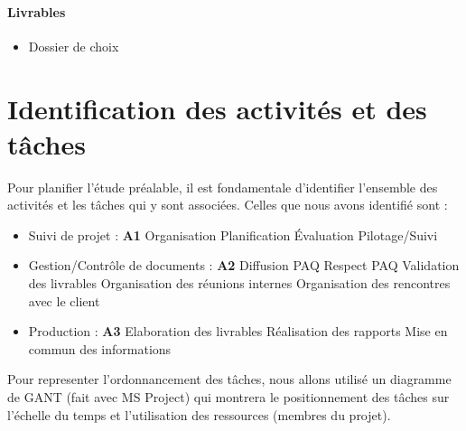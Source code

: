 \paragraph{Livrables}
\begin{itemize}
    \item Dossier de choix
\end{itemize}

\section{Identification des activités et des tâches}

Pour planifier l’étude préalable, il est fondamentale d’identifier l’ensemble des activités et les tâches qui y sont associées. Celles que nous avons identifié sont :
\begin{itemize}
    \item Suivi de projet : {\bf A1}
        \subitem Organisation
        \subitem Planification
        \subitem Évaluation
        \subitem Pilotage/Suivi

    \item Gestion/Contrôle de documents : {\bf A2}
        \subitem Diffusion PAQ
        \subitem Respect PAQ
        \subitem Validation des livrables
        \subitem Organisation des réunions internes
        \subitem Organisation des rencontres avec le client

    \item Production : {\bf A3}
        \subitem Elaboration des livrables
        \subitem Réalisation des rapports
        \subitem Mise en commun des informations
\end{itemize}

Pour representer l’ordonnancement des tâches, nous allons utilisé un diagramme de GANT (fait avec MS Project) qui montrera le positionnement des tâches sur l’échelle du temps et l’utilisation des ressources (membres du projet).


